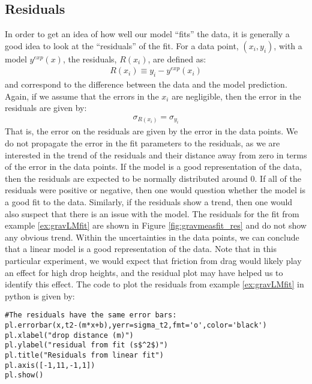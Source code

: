 \subsection{Residuals}
In order to get an idea of how well our model ``fits'' the data, it is generally a good idea to look at the ``residuals'' of the fit. For a data point, $(x_i,y_i)$, with a model $y^{exp}(x)$, the residuals, $R(x_i)$, are defined as:
\begin{align}
R(x_i)\equiv y_i-y^{exp}(x_i)
\end{align}
and correspond to the difference between the data and the model prediction. Again, if we assume that the errors in the $x_i$ are negligible, then the error in the residuals are given by:
\begin{align}
\sigma_{R(x_i)}=\sigma_{y_i}
\end{align}
That is, the error on the residuals are given by the error in the data points. We do not propagate the error in the fit parameters to the residuals, as we are interested in the trend of the residuals and their distance away from zero in terms of the error in the data points. If the model is a good representation of the data, then the residuals are expected to be normally distributed around 0. If all of the residuals were positive or negative, then one would question whether the model is a good fit to the data. Similarly, if the residuals show a trend, then one would also suspect that there is an issue with the model. The residuals for the fit from example \ref{ex:gravLMfit} are shown in Figure \ref{fig:gravmeasfit_res} and do not show any obvious trend. Within the uncertainties in the data points, we can conclude that a linear model is a good representation of the data. Note that in this particular experiment, we would expect that friction from drag would likely play an effect for high drop heights, and the residual plot may have helped us to identify this effect. The code to plot the residuals from example \ref{ex:gravLMfit} in python is given by:
\begin{lstlisting}[frame=single] 
#The residuals have the same error bars:
pl.errorbar(x,t2-(m*x+b),yerr=sigma_t2,fmt='o',color='black')
pl.xlabel("drop distance (m)")
pl.ylabel("residual from fit (s$^2$)")
pl.title("Residuals from linear fit")
pl.axis([-1,11,-1,1])
pl.show()
\end{lstlisting} 



